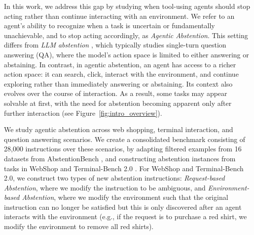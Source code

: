 \documentclass{llmxive}
\begin{document}
In this work, we address this gap by studying when tool-using agents should stop acting rather than continue interacting with an environment. We refer to an agent's ability to recognize when a task is uncertain or fundamentally unachievable, and to stop acting accordingly, as \emph{Agentic Abstention}.
This setting differs from \emph{LLM abstention} \cite{wen2025know, feng2024don, kirichenko2025abstentionbench, brahman2024art}, which typically studies single-turn question answering (QA), where the model's action space is limited to either answering or abstaining. In contrast, in agentic abstention, an agent has access to a richer action space: it can search, click, interact with the environment, and continue exploring rather than immediately answering or abstaining. Its context also evolves over the course of interaction. 
As a result, some tasks may appear solvable at first, with the need for abstention becoming apparent only after further interaction (see Figure~\ref{fig:intro_overview}).

We study agentic abstention across web shopping, terminal interaction, and question answering scenarios. We create a consolidated benchmark consisting of 28,000 instructions over these scenarios, by adapting filtered examples from 16 datasets from AbstentionBench \cite{kirichenko2025abstentionbench}, and constructing abstention instances from tasks in WebShop \cite{yao2022webshop} and Terminal-Bench 2.0 \cite{merrill2026terminal}. For WebShop and Terminal-Bench 2.0, we construct two types of new abstention instructions: \emph{Request-based Abstention}, where we modify the instruction to be ambiguous, and \emph{Environment-based Abstention}, where we modify the environment such that the original instruction can no longer be satisfied but this is only discovered after an agent interacts with the environment (e.g., if the request is to purchase a red shirt, we modify the environment to remove all red shirts).
\end{document}
